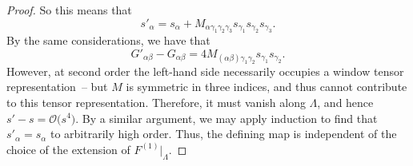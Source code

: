 \begin{proof}
So this means that
\[
s'_{\alpha} = s_{\alpha} + M_{\alpha \gamma_1 \gamma_2 \gamma_3} s_{\gamma_1} s_{\gamma_2} s_{\gamma_3} .
\]
By the same considerations, we have that
\[
G'_{\alpha \beta} - G_{\alpha \beta} = 4 M_{(\alpha \beta) \gamma_1 \gamma_2} s_{\gamma_1} s_{\gamma_2} .
\]
However, at second order the left-hand side necessarily occupies a window tensor representation~-- but $M$ is symmetric in three indices, and thus cannot contribute to this tensor representation. Therefore, it must vanish along $\Lambda$, and hence $s' - s = \mathcal{O}\bigl(s^4\bigr)$. By a similar argument, we may apply induction to find that $s'_{\alpha} = s_{\alpha}$ to arbitrarily high order. Thus, the defining map is independent of the choice of the extension of $F^{(1)}|_{\Lambda}$.
\end{proof}
